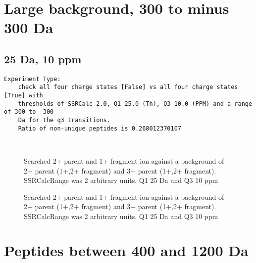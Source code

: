 \section{Large background, 300 to minus 300 Da}
\subsection{25 Da, 10 ppm }

\begin{verbatim}
Experiment Type:
    check all four charge states [False] vs all four charge states [True] with
    thresholds of SSRCalc 2.0, Q1 25.0 (Th), Q3 10.0 (PPM) and a range of 300 to -300
    Da for the q3 transitions.  
    Ratio of non-unique peptides is 0.268012370107
\end{verbatim}


\begin{figure}

\center
{} \\

\caption{
Searched 2+ parent and 1+ fragment ion against a background of 2+ parent (1+,2+ fragment) and 3+ parent (1+,2+ fragment).
SSRCalcRange was 2 arbitrary units, Q1 25 Da and Q3 10 ppm
}
\label{fig:2.25Da_10ppm}
\end{figure}
\begin{figure}

\center
{}

\caption{
Searched 2+ parent and 1+ fragment ion against a background of 2+ parent (1+,2+ fragment) and 3+ parent (1+,2+ fragment).
SSRCalcRange was 2 arbitrary units, Q1 25 Da and Q3 10 ppm
}
\label{fig:2.25Da_10ppm_q3dist}
\end{figure}



\clearpage
\section{Peptides between 400 and 1200 Da}

